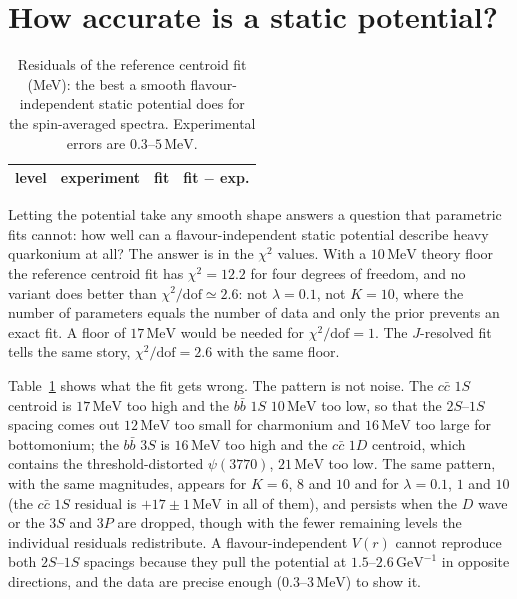 \documentclass[10pt,twocolumn]{article}
\newcommand{\cc}{c\bar c}
\newcommand{\bb}{b\bar b}
\newcommand{\MeV}{\,\mathrm{MeV}}
\newcommand{\GeVi}{\,\mathrm{GeV}^{-1}}
\begin{document}
\section{How accurate is a static potential?}
\label{sec:accuracy}

\begin{table}[t]
\caption{Residuals of the reference centroid fit (MeV): the best a smooth flavour-independent static potential does for the spin-averaged spectra. Experimental errors are $0.3$--$5\MeV$.}
\label{tab:cres}
\centering\small
\begin{tabular}{lccc}
\toprule
level & experiment & fit & fit $-$ exp. \\
\midrule

\end{tabular}
\end{table}

Letting the potential take any smooth shape answers a question that parametric fits cannot: how well can a flavour-independent static potential describe heavy quarkonium at all?
The answer is in the $\chi^2$ values.
With a $10\MeV$ theory floor the reference centroid fit has $\chi^2=12.2$ for four degrees of freedom, and no variant does better than $\chi^2/\mathrm{dof}\simeq2.6$: not $\lambda=0.1$, not $K=10$, where the number of parameters equals the number of data and only the prior prevents an exact fit.
A floor of $17\MeV$ would be needed for $\chi^2/\mathrm{dof}=1$.
The $J$-resolved fit tells the same story, $\chi^2/\mathrm{dof}=2.6$ with the same floor.

Table~\ref{tab:cres} shows what the fit gets wrong.
The pattern is not noise.
The $\cc$ $1S$ centroid is $17\MeV$ too high and the $\bb$ $1S$ $10\MeV$ too low, so that the $2S$--$1S$ spacing comes out $12\MeV$ too small for charmonium and $16\MeV$ too large for bottomonium; the $\bb$ $3S$ is $16\MeV$ too high and the $\cc$ $1D$ centroid, which contains the threshold-distorted $\psi(3770)$, $21\MeV$ too low.
The same pattern, with the same magnitudes, appears for $K=6$, $8$ and $10$ and for $\lambda=0.1$, $1$ and $10$ (the $\cc$ $1S$ residual is $+17\pm1\MeV$ in all of them), and persists when the $D$ wave or the $3S$ and $3P$ are dropped, though with the fewer remaining levels the individual residuals redistribute.
A flavour-independent $V(r)$ cannot reproduce both $2S$--$1S$ spacings because they pull the potential at $1.5$--$2.6\GeVi$ in opposite directions, and the data are precise enough ($0.3$--$3\MeV$) to show it.
\end{document}
